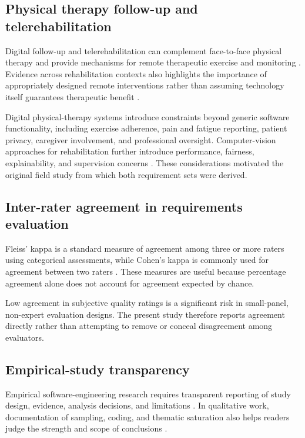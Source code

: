 \documentclass[pdflatex,sn-basic]{sn-jnl}
\begin{document}
\subsection{Physical therapy follow-up and telerehabilitation}

Digital follow-up and telerehabilitation can complement face-to-face physical therapy and provide mechanisms for remote therapeutic exercise and monitoring \citep{munoztomas2023telerehabilitation,susomarti2021effectiveness}. Evidence across rehabilitation contexts also highlights the importance of appropriately designed remote interventions rather than assuming technology itself guarantees therapeutic benefit \citep{gava2022shoulder}.

Digital physical-therapy systems introduce constraints beyond generic software functionality, including exercise adherence, pain and fatigue reporting, patient privacy, caregiver involvement, and professional oversight. Computer-vision approaches for rehabilitation further introduce performance, fairness, explainability, and supervision concerns \citep{debnath2022rehabilitation,chazette2020explainability}. These considerations motivated the original field study from which both requirement sets were derived.

\subsection{Inter-rater agreement in requirements evaluation}

Fleiss' kappa is a standard measure of agreement among three or more raters using categorical assessments, while Cohen's kappa is commonly used for agreement between two raters \citep{fleiss1971measuring,cohen1960coefficient}. These measures are useful because percentage agreement alone does not account for agreement expected by chance.

Low agreement in subjective quality ratings is a significant risk in small-panel, non-expert evaluation designs. The present study therefore reports agreement directly rather than attempting to remove or conceal disagreement among evaluators.

\subsection{Empirical-study transparency}

Empirical software-engineering research requires transparent reporting of study design, evidence, analysis decisions, and limitations \citep{runeson2009guidelines,wohlin2012experimentation}. In qualitative work, documentation of sampling, coding, and thematic saturation also helps readers judge the strength and scope of conclusions \citep{guest2006interviews,hennink2017codesaturation}.
\end{document}
